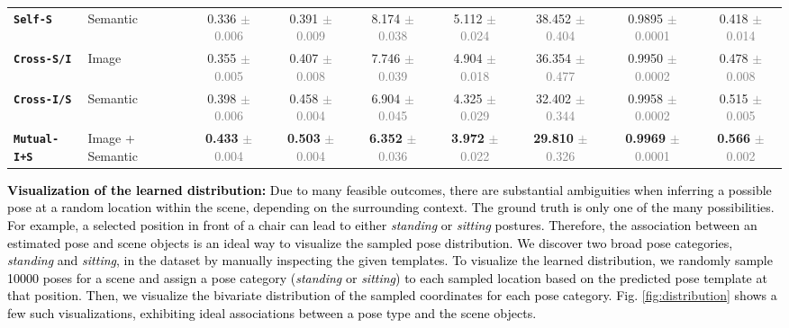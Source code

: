 \begin{table*}[t]
{\begin{tabular}{llccccccc}
\texttt{\textbf{Self-S}} & Semantic &
0.336 \textcolor{gray}{$\pm$0.006} & 0.391 \textcolor{gray}{$\pm$0.009} & 8.174 \textcolor{gray}{$\pm$0.038} & 5.112 \textcolor{gray}{$\pm$0.024} & 38.452 \textcolor{gray}{$\pm$0.404} & 0.9895 \textcolor{gray}{$\pm$0.0001} & 0.418 \textcolor{gray}{$\pm$0.014} \\
\texttt{\textbf{Cross-S/I}} & Image &
0.355 \textcolor{gray}{$\pm$0.005} & 0.407 \textcolor{gray}{$\pm$0.008} & 7.746 \textcolor{gray}{$\pm$0.039} & 4.904 \textcolor{gray}{$\pm$0.018} & 36.354 \textcolor{gray}{$\pm$0.477} & 0.9950 \textcolor{gray}{$\pm$0.0002} & 0.478 \textcolor{gray}{$\pm$0.008} \\
\texttt{\textbf{Cross-I/S}} & Semantic &
0.398 \textcolor{gray}{$\pm$0.006} & 0.458 \textcolor{gray}{$\pm$0.004} & 6.904 \textcolor{gray}{$\pm$0.045} & 4.325 \textcolor{gray}{$\pm$0.029} & 32.402 \textcolor{gray}{$\pm$0.344} & 0.9958 \textcolor{gray}{$\pm$0.0002} & 0.515 \textcolor{gray}{$\pm$0.005} \\
\rowcolor[HTML]{CCFFCC}
\texttt{\textbf{Mutual-I+S}} & Image + Semantic &
\textbf{0.433} \textcolor{gray}{$\pm$0.004} & \textbf{0.503} \textcolor{gray}{$\pm$0.004} & \textbf{6.352} \textcolor{gray}{$\pm$0.036} & \textbf{3.972} \textcolor{gray}{$\pm$0.022} & \textbf{29.810} \textcolor{gray}{$\pm$0.326} & \textbf{0.9969} \textcolor{gray}{$\pm$0.0001} & \textbf{0.566} \textcolor{gray}{$\pm$0.002} \\ \hline %
\end{tabular}%
}
\end{table*}

\noindent
\textcolor{black}{\textbf{Visualization of the learned distribution:}
Due to many feasible outcomes, there are substantial ambiguities when inferring a possible pose at a random location within the scene, depending on the surrounding context. The ground truth is only one of the many possibilities. For example, a selected position in front of a chair can lead to either \emph{standing} or \emph{sitting} postures. Therefore, the association between an estimated pose and scene objects is an ideal way to visualize the sampled pose distribution. We discover two broad pose categories, \emph{standing} and \emph{sitting}, in the dataset by manually inspecting the given templates. To visualize the learned distribution, we randomly sample 10000 poses for a scene and assign a pose category (\emph{standing} or \emph{sitting}) to each sampled location based on the predicted pose template at that position. Then, we visualize the bivariate distribution of the sampled coordinates for each pose category. Fig. \ref{fig:distribution} shows a few such visualizations, exhibiting ideal associations between a pose type and the scene objects.}


